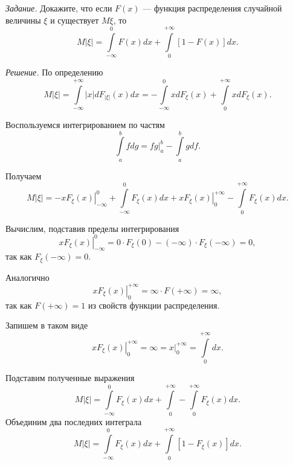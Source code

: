 \textit{Задание.} Докажите, что если $F \left( x \right) $ --- функция распределения случайной величины $ \xi $ и существует $M \xi $, то
$$M \left| \xi \right| =
\int \limits_{- \infty }^0 F \left( x \right) dx + \int \limits_0^{+ \infty } \left[ 1 - F \left( x \right) \right] dx.$$

\textit{Решение.} По определению
$$M \left| \xi \right| =
\int \limits_{- \infty }^{+ \infty } \left| x \right| dF_{ \left| \xi \right| } \left( x \right) dx =
- \int \limits_{- \infty }^0 xdF_{ \xi } \left( x \right) + \int \limits_0^{+ \infty } xdF_{ \xi } \left( x \right).$$

Воспользуемся интегрированием по частям
$$ \int \limits_a^b fdg =
\left. fg \right|_a^b - \int \limits_a^b gdf.$$

Получаем
$$M \left| \xi \right| =
\left. -xF_{ \xi } \left( x \right) \right|_{- \infty }^0 + \int \limits_{- \infty }^0 F_{ \xi } \left( x \right) dx +
\left. xF_{ \xi } \left( x \right) \right|_0^{+ \infty } - \int \limits_0^{+ \infty } F_{ \xi } \left( x \right) dx.$$

Вычислим, подставив пределы интегрирования
$$ \left. xF_{ \xi } \left( x \right) \right|_{- \infty }^0 =
0 \cdot F_{ \xi } \left( 0 \right) - \left( - \infty \right) \cdot F_{ \xi } \left( - \infty \right) = 0,$$
так как $F_{ \xi } \left( - \infty \right) = 0$.

Аналогично
$$ \left. xF_{ \xi } \left( x \right) \right|_0^{+ \infty } = \infty \cdot F \left( + \infty \right) = \infty,$$
так как $F \left( + \infty \right) = 1$ из свойств функции распределения.

Запишем в таком виде
$$ \left. xF_{ \xi } \left( x \right) \right|_0^{+ \infty } =
\infty =
\left. x \right|_0^{+ \infty } =
\int \limits_0^{+ \infty } dx.$$

Подставим полученные выражения
$$M \left| \xi \right| =
\int \limits_{- \infty }^0 F_{ \xi } \left( x \right) dx + \int \limits_0^{+ \infty } -
\int \limits_0^{+ \infty } F_{ \xi } \left( x \right) dx.$$
Объединим два последних интеграла
$$M \left| \xi \right| =
\int \limits_{- \infty }^0 F_{ \xi } \left( x \right) dx + \int \limits_0^{+ \infty } \left[ 1 - F_{ \xi } \left( x \right) \right] dx.$$
